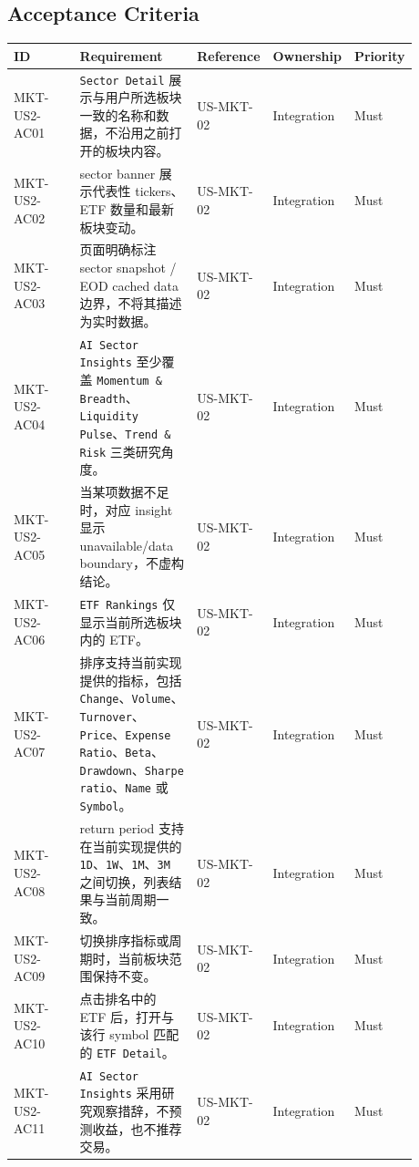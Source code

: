 \subsection{Acceptance Criteria}
\begingroup
\small
\begin{longtable}{L{0.18\linewidth}L{0.30\linewidth}L{0.18\linewidth}L{0.12\linewidth}L{0.10\linewidth}}
\toprule
\textbf{ID} & \textbf{Requirement} & \textbf{Reference} & \textbf{Ownership} & \textbf{Priority} \\
\midrule
MKT-US2-AC01 & \texttt{Sector Detail} 展示与用户所选板块一致的名称和数据，不沿用之前打开的板块内容。 & US-MKT-02 & Integration & Must \\
MKT-US2-AC02 & sector banner 展示代表性 tickers、ETF 数量和最新板块变动。 & US-MKT-02 & Integration & Must \\
MKT-US2-AC03 & 页面明确标注 sector snapshot /\allowbreak{} EOD cached data 边界，不将其描述为实时数据。 & US-MKT-02 & Integration & Must \\
MKT-US2-AC04 & \texttt{AI Sector Insights} 至少覆盖 \texttt{Momentum \& Breadth}、\texttt{Liquidity Pulse}、\texttt{Trend \& Risk} 三类研究角度。 & US-MKT-02 & Integration & Must \\
MKT-US2-AC05 & 当某项数据不足时，对应 insight 显示 unavailable/\allowbreak{}data boundary，不虚构结论。 & US-MKT-02 & Integration & Must \\
MKT-US2-AC06 & \texttt{ETF Rankings} 仅显示当前所选板块内的 ETF。 & US-MKT-02 & Integration & Must \\
MKT-US2-AC07 & 排序支持当前实现提供的指标，包括 \texttt{Change}、\texttt{Volume}、\texttt{Turnover}、\texttt{Price}、\texttt{Expense Ratio}、\texttt{Beta}、\texttt{Drawdown}、\texttt{Sharpe ratio}、\texttt{Name} 或 \texttt{Symbol}。 & US-MKT-02 & Integration & Must \\
MKT-US2-AC08 & return period 支持在当前实现提供的 \texttt{1D}、\texttt{1W}、\texttt{1M}、\texttt{3M} 之间切换，列表结果与当前周期一致。 & US-MKT-02 & Integration & Must \\
MKT-US2-AC09 & 切换排序指标或周期时，当前板块范围保持不变。 & US-MKT-02 & Integration & Must \\
MKT-US2-AC10 & 点击排名中的 ETF 后，打开与该行 symbol 匹配的 \texttt{ETF Detail}。 & US-MKT-02 & Integration & Must \\
MKT-US2-AC11 & \texttt{AI Sector Insights} 采用研究观察措辞，不预测收益，也不推荐交易。 & US-MKT-02 & Integration & Must \\
\bottomrule
\end{longtable}
\endgroup
\prdhr
\hypertarget{us-mkt-03}{}
